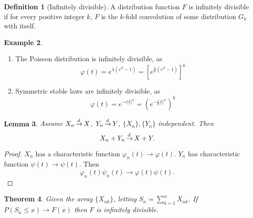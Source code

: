 \documentclass[10pt, oneside, reqno]{amsart}
\theoremstyle{plain}%
\newtheorem{thm}{Theorem}[section]
\newtheorem{lem}[thm]{Lemma}
\theoremstyle{definition}
\newtheorem{defn}[thm]{Definition}
\newtheorem{exmp}[thm]{Example}
\theoremstyle{remark}
\renewcommand{\phi}{\varphi}
\def\cid{\,{\buildrel \!d \over \rightarrow}\,}
\begin{document}
\begin{defn}[Infinitely divisible]
    A distribution function $F$ is infinitely divisible if for every positive integer $k$, $F$ is the $k$-fold convolution of some distribution $G_k$ with itself.  
\end{defn}

\begin{exmp}
    \begin{enumerate}[(1)]
        \item The Poisson distribution is infinitely divisible, as \[
            \phi(t) = e^{\lambda(e^{it} - 1)} = \left[ e^{\frac{\lambda}{k}(e^{it} - 1)} \right]^k
        \]
        \item Symmetric stable laws are infinitely divisible, as \[
            \phi(t) = e^{-c|t|^\alpha} = \left( e^{-\frac{c}{k}|t|^\alpha} \right)^k
        \]
    \end{enumerate}
\end{exmp}

\begin{lem}
    Assume $X_n \cid X$, $Y_n \cid Y$, $\{ X_n \}, \{ Y_n \}$ independent.  Then \[
        X_n + Y_n \cid X + Y.
        \]  
\end{lem}
\begin{proof}
    $X_n$ has a characteristic function $\phi_n(t) \rightarrow \phi(t)$.  $Y_n$ has characteristic function $\psi(t) \rightarrow \psi(t)$. Then \[
        \phi_n(t) \psi_n(t) \rightarrow \phi(t) \psi(t).
    \]   
\end{proof}

\begin{thm}
    Given the array $\{ X_{nk} \}$, letting $S_n = \sum_{k=1}^n X_{nk}$.  If $P(S_n \leq x) \rightarrow F(x)$ then $F$ is infinitely divisible.  
\end{thm}
\end{document}

